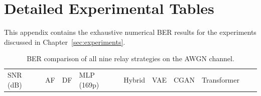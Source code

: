 \chapter{Detailed Experimental Tables}\label{chap:app-tables}
This appendix contains the exhaustive numerical BER results for the experiments discussed in Chapter~\ref{sec:experiments}.

\begin{longtable}[]{@{}
  >{\raggedright\arraybackslash}p{}
  >{\raggedright\arraybackslash}p{}
  >{\raggedright\arraybackslash}p{}
  >{\raggedright\arraybackslash}p{}
  >{\raggedright\arraybackslash}p{}
  >{\raggedright\arraybackslash}p{}
  >{\raggedright\arraybackslash}p{}
  >{\raggedright\arraybackslash}p{}
  >{\raggedright\arraybackslash}p{}
  >{\raggedright\arraybackslash}p{}@{}}
\caption{BER comparison of all nine relay strategies on the AWGN channel.}\label{tbl:table1}\tabularnewline
\toprule\noalign{}
\begin{minipage}[b]{\linewidth}\raggedright
SNR (dB)
\end{minipage} & \begin{minipage}[b]{\linewidth}\raggedright
AF
\end{minipage} & \begin{minipage}[b]{\linewidth}\raggedright
DF
\end{minipage} & \begin{minipage}[b]{\linewidth}\raggedright
MLP (169p)
\end{minipage} & \begin{minipage}[b]{\linewidth}\raggedright
Hybrid
\end{minipage} & \begin{minipage}[b]{\linewidth}\raggedright
VAE
\end{minipage} & \begin{minipage}[b]{\linewidth}\raggedright
CGAN
\end{minipage} & \begin{minipage}[b]{\linewidth}\raggedright
Transformer
\end{minipage} & \begin{minipage}[b]{\linewidth}\raggedright

\end{minipage}
\end{longtable}
